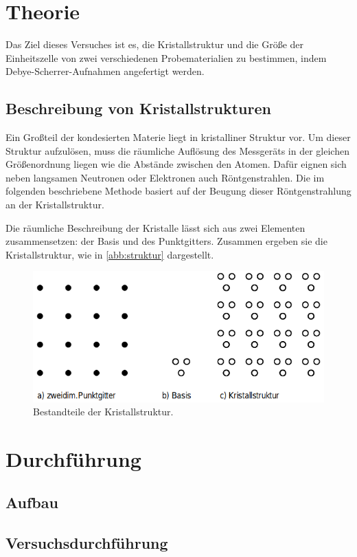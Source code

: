 \section{Theorie}
Das Ziel dieses Versuches ist es, die Kristallstruktur und die Größe der Einheitszelle
von zwei verschiedenen Probematerialien zu bestimmen, indem Debye-Scherrer-Aufnahmen
angefertigt werden.

\subsection{Beschreibung von Kristallstrukturen}
Ein Großteil der kondesierten Materie liegt in kristalliner Struktur vor.
Um dieser Struktur aufzulösen, muss die räumliche Auflösung des Messgeräts in der
gleichen Größenordnung liegen wie die Abstände zwischen den Atomen. Dafür eignen sich
neben langsamen Neutronen oder Elektronen auch Röntgenstrahlen. Die im folgenden
beschriebene Methode basiert auf der Beugung dieser Röntgenstrahlung an der Kristallstruktur.

Die räumliche Beschreibung der Kristalle lässt sich aus zwei Elementen zusammensetzen:
der Basis und des Punktgitters. Zusammen ergeben sie die Kristallstruktur, wie in
\autoref{abb:struktur} dargestellt.
\begin{figure}
  \centering
  \includegraphics[scale=0.5]{content/pics/basis_gitter.png}
  \caption{Bestandteile der Kristallstruktur. \cite{anleitung}}
  \label{abb:struktur}
\end{figure}

\section{Durchführung}
\subsection{Aufbau}
\subsection{Versuchsdurchführung}
